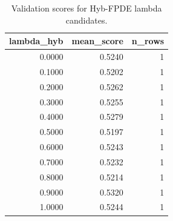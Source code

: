 \begin{table}[t]
\caption{Validation scores for Hyb-FPDE lambda candidates.}
\label{tab:lambda_distribution_computed}
\centering
\begin{tabular}{rrr}
\toprule
lambda\_hyb & mean\_score & n\_rows \\
\midrule
0.0000 & 0.5240 & 1 \\
0.1000 & 0.5202 & 1 \\
0.2000 & 0.5262 & 1 \\
0.3000 & 0.5255 & 1 \\
0.4000 & 0.5279 & 1 \\
0.5000 & 0.5197 & 1 \\
0.6000 & 0.5243 & 1 \\
0.7000 & 0.5232 & 1 \\
0.8000 & 0.5214 & 1 \\
0.9000 & 0.5320 & 1 \\
1.0000 & 0.5244 & 1 \\
\bottomrule
\end{tabular}

\end{table}

